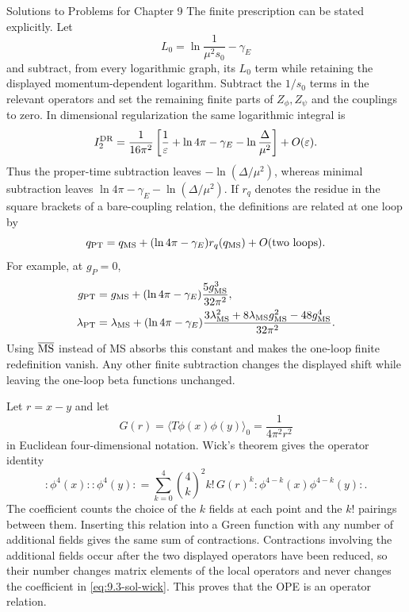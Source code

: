 \begin{bankssolutions}{Solutions to Problems for Chapter 9}
The finite prescription can be stated explicitly.  Let
\[
 L_0=\ln\frac{1}{\mu^2s_0}-\gamma_E
\]
and subtract, from every logarithmic graph, its $L_0$ term while retaining
the displayed momentum-dependent logarithm.  Subtract the $1/s_0$ terms in
the relevant operators and set the remaining finite parts of
$Z_\phi,Z_\psi$ and the couplings to zero.  In dimensional regularization
the same logarithmic integral is
\[
 I_2^{\rm DR}=\frac{1}{16\pi^2}
 \left[\frac1\varepsilon+\ln4\pi-\gamma_E
 -\ln\frac{\Delta}{\mu^2}\right]+O(\varepsilon).
\]
Thus the proper-time subtraction leaves $-\ln(\Delta/\mu^2)$, whereas
minimal subtraction leaves
$\ln4\pi-\gamma_E-\ln(\Delta/\mu^2)$.  If $r_q$ denotes the residue in
the square brackets of a bare-coupling relation, the definitions are related
at one loop by
\[
 q_{\rm PT}=q_{\rm MS}
 +(\ln4\pi-\gamma_E)r_q(q_{\rm MS})+O(\hbox{two loops}).
\]
For example, at $g_P=0$,
\begin{align*}
 g_{\rm PT}&=g_{\rm MS}
 +(\ln4\pi-\gamma_E)\frac{5g_{\rm MS}^3}{32\pi^2},\\
 \lambda_{\rm PT}&=\lambda_{\rm MS}
 +(\ln4\pi-\gamma_E)\frac{3\lambda_{\rm MS}^2
 +8\lambda_{\rm MS}g_{\rm MS}^2-48g_{\rm MS}^4}{32\pi^2}.
\end{align*}
Using $\overline{\rm MS}$ instead of MS absorbs this constant and makes the
one-loop finite redefinition vanish.  Any other finite subtraction changes
the displayed shift while leaving the one-loop beta functions unchanged.

Let $r=x-y$ and let
\[
 G(r)=\langle T\phi(x)\phi(y)\rangle_0
      =\frac{1}{4\pi^2r^2}
\]
in Euclidean four-dimensional notation.  Wick's theorem gives the operator
identity
\begin{equation}
 :\!\phi^4(x)\!::\!\phi^4(y)\!:
 =\sum_{k=0}^{4}\binom4k^2 k!\,G(r)^k
 :\!\phi^{4-k}(x)\phi^{4-k}(y)\!: .
 \label{eq:9.3-sol-wick}
\end{equation}
The coefficient counts the choice of the $k$ fields at each point and the
$k!$ pairings between them.  Inserting this relation into a Green function
with any number of additional fields gives the same sum of contractions.
Contractions involving the additional fields occur after the two displayed
operators have been reduced, so their number changes matrix elements of the
local operators and never changes the coefficient in \eqref{eq:9.3-sol-wick}.
This proves that the OPE is an operator relation.


\end{bankssolutions}
